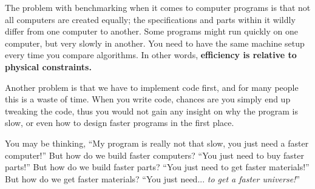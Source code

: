 \begin{example}[Benchmarking]

\end{example}

The problem with benchmarking when it comes to computer programs is that not all computers are created equally; the specifications and parts within it wildly differ from one computer to another. Some programs might run quickly on one computer, but very slowly in another. You need to have the same machine setup every time you compare algorithms. In other words, \textbf{efficiency is relative to physical constraints.}

Another problem is that we have to implement code first, and for many people this is a waste of time. When you write code, chances are you simply end up tweaking the code, thus you would not gain any insight on why the program is slow, or even how to design faster programs in the first place. 

You may be thinking, ``My program is really not that slow, you just need a faster computer!'' But how do we build faster computers? ``You just need to buy faster parts!'' But how do we build faster parts? ``You just need to get faster materials!'' But how do we get faster materials? ``You just need... \textit{to get a faster universe!}''


